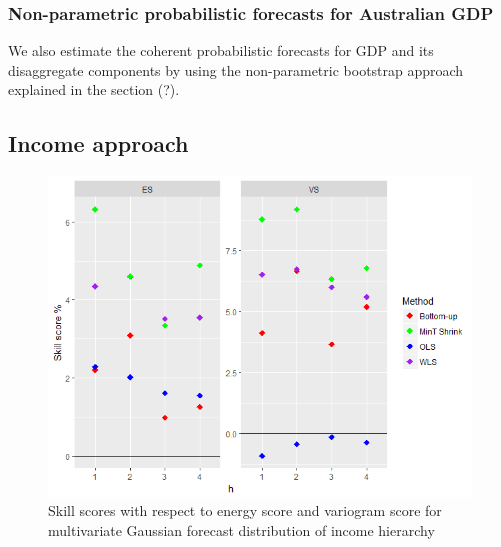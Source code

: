 \documentclass[graybox]{svmult}
\begin{document}
\subsubsection{Non-parametric probabilistic forecasts for Australian GDP}

We also estimate the coherent probabilistic forecasts for GDP and its disaggregate components by using the non-parametric bootstrap approach explained in the section (?).

\subsection*{Income approach}

\begin{figure}[H]
	\centering
	\small
	\includegraphics[scale=0.50]{Figs/Results/INC-ProbNonParaF-MultivS_ES_VS.PNG}
	\caption{Skill scores with respect to energy score and variogram score for multivariate Gaussian forecast distribution of income hierarchy}\label{Inc_ProbNonParF_ES_VS}
\end{figure}
\end{document}
